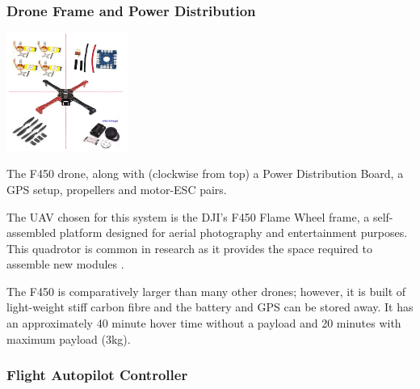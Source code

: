 
\subsubsection{Drone Frame and Power Distribution}

\begin{marginfigure}%
  \hspace{0.25cm}
  \includegraphics[width=4cm]{images/stage_system/f450_setup.png}
  \caption{ The F450 drone, along with (clockwise from top) a Power Distribution Board, a GPS setup, propellers and motor-ESC pairs.}
\end{marginfigure}

The UAV chosen for this system is the DJI's F450 Flame Wheel frame, a self-assembled platform designed for aerial photography and entertainment purposes.  This quadrotor is common in research as it provides the space required to assemble new modules \cite{sørensen_jacobsen_hansen_2017} \cite{tezza_andujar_2019}.

The F450 is comparatively larger than many other drones; however, it is built of light-weight stiff carbon fibre and the battery and GPS can be stored away. It has an approximately 40 minute hover time without a payload and 20 minutes with maximum payload (3kg). 


\subsubsection{Flight Autopilot Controller}

